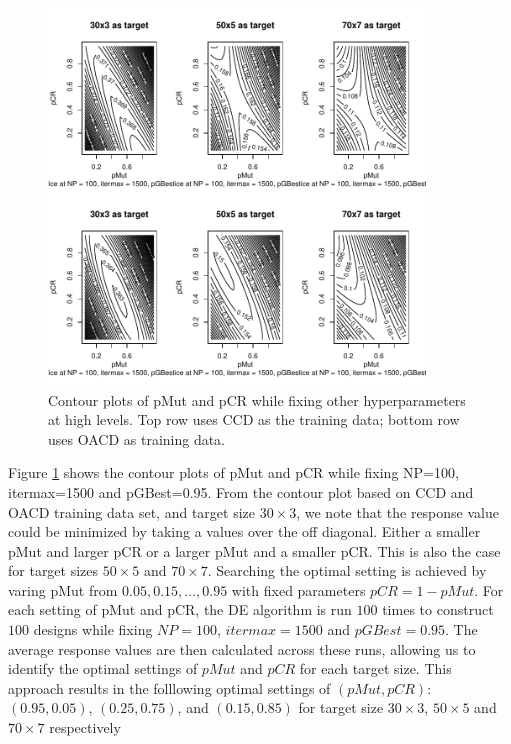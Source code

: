 \documentclass [PhD] {package/uclathes}
\begin{document}

\begin{figure}
\centering
\includegraphics[height=10cm, width=\textwidth]{chapters/DE/pdfs/contours}
\caption{Contour plots of pMut and pCR while fixing other hyperparameters at high levels. Top row uses CCD as the training data; bottom row uses OACD as training data.}
\label{fig:contours}
\end{figure}

Figure \ref{fig:contours} shows the contour plots of pMut and pCR while fixing NP=100, itermax=1500 and pGBest=0.95. From the contour plot based on CCD and OACD training data set, and target size $30\times 3$, we note that the response value could be minimized by taking a values over the off diagonal. Either a smaller pMut and larger pCR or a larger pMut and a smaller pCR. This is also the case for target sizes $50\times5$ and $70\times 7$. Searching the optimal setting is achieved by  varing pMut from $0.05, 0.15, \ldots, 0.95$ with fixed parameters $pCR=1-pMut$. For each setting of pMut and pCR, the DE algorithm is run $100$ times to construct $100$ designs while fixing $NP=100$, $itermax=1500$ and $pGBest=0.95$. The average response values are then calculated across these runs, allowing us to identify the optimal settings of $pMut$ and $pCR$ for each target size. This approach results in the folllowing optimal settings of $(pMut, pCR)$: $(0.95, 0.05)$, $(0.25, 0.75)$, and $(0.15, 0.85)$ for target size $30\times3$, $50\times5$ and $70\times7$ respectively
\end{document}
